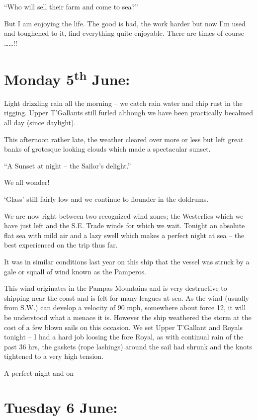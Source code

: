 \documentclass[
  11pt,
  msmallroyalvopaper
]{memoir}
\begin{document}
``Who will sell their farm and come to sea?''

But I am enjoying the life. The good is bad, the work harder but now I'm
used and toughened to it, find everything quite enjoyable. There are
times of course \ldots\ldots!!

\hypertarget{monday-5th-june}{%
\section{\texorpdfstring{Monday 5\textsuperscript{th}
June:}{Monday 5th June:}}\label{monday-5th-june}}

Light drizzling rain all the morning -- we catch rain water and chip
rust in the rigging. Upper T'Gallants still furled although we have been
practically becalmed all day (since daylight).

This afternoon rather late, the weather cleared over more or less but
left great banks of grotesque looking clouds which made a spectacular
sunset.

``A Sunset at night -- the Sailor's delight.''

We all wonder!

`Glass' still fairly low and we continue to flounder in the doldrums.

We are now right between two recognized wind zones; the Westerlies which
we have just left and the S.E. Trade winds for which we wait. Tonight an
absolute flat sea with mild air and a lazy swell which makes a perfect
night at sea -- the best experienced on the trip thus far.

It was in similar conditions last year on this ship that the vessel was
struck by a gale or squall of wind known as the Pamperos.

This wind originates in the Pampas Mountains and is very destructive to
shipping near the coast and is felt for many leagues at sea. As the wind
(usually from S.W.) can develop a velocity of 90 mph, somewhere about
force 12, it will be understood what a menace it is. However the ship
weathered the storm at the cost of a few blown sails on this occasion.
We set Upper T'Gallant and Royals tonight -- I had a hard job loosing
the fore Royal, as with continual rain of the past 36 hrs, the gaskets
(rope lashings) around the sail had shrunk and the knots tightened to a
very high tension.

A perfect night and on

\hypertarget{tuesday-6-june}{%
\section{Tuesday 6 June:}\label{tuesday-6-june}}
\end{document}
